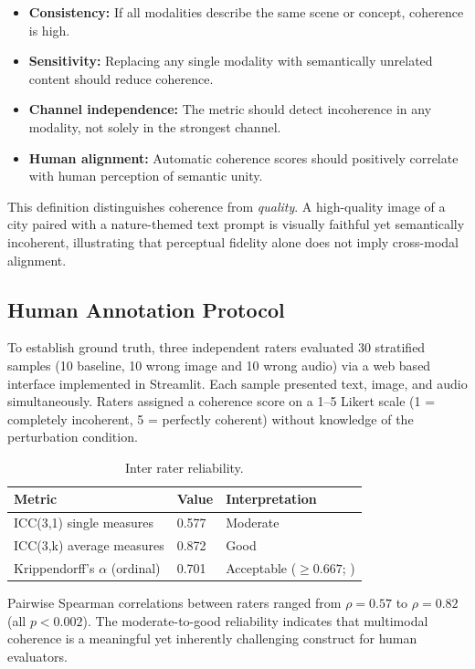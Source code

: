 \documentclass[a4paper,fleqn]{cas-sc}
\begin{document}
\begin{itemize}
    \item \textbf{Consistency:} If all modalities describe the same scene or concept, coherence is high.
    \item \textbf{Sensitivity:} Replacing any single modality with semantically unrelated content should reduce coherence.
    \item \textbf{Channel independence:} The metric should detect incoherence in any modality, not solely in the strongest channel.
    \item \textbf{Human alignment:} Automatic coherence scores should positively correlate with human perception of semantic unity.
\end{itemize}

This definition distinguishes coherence from \emph{quality}. A high-quality image of a city paired with a nature-themed text prompt is visually faithful yet semantically incoherent, illustrating that perceptual fidelity alone does not imply cross-modal alignment.

\subsection{Human Annotation Protocol}

To establish ground truth, three independent raters evaluated 30 stratified samples (10 baseline, 10 wrong image and 10 wrong audio) via a web based interface implemented in Streamlit. Each sample presented text, image, and audio simultaneously. Raters assigned a coherence score on a 1--5 Likert scale (1 = completely incoherent, 5 = perfectly coherent) without knowledge of the perturbation condition.

\begin{table}[!b]
\centering
\caption{Inter rater reliability.}
\label{tab:irr}
\begin{tabular}{lll}
\toprule
Metric & Value & Interpretation \\
\midrule
ICC(3,1) single measures & 0.577 & Moderate \citep{Koo2016} \\
ICC(3,k) average measures & 0.872 & Good \\
Krippendorff's $\alpha$ (ordinal) & 0.701 & Acceptable ($\geq 0.667$; \citealp{Krippendorff2011}) \\
\bottomrule
\end{tabular}
\end{table}

Pairwise Spearman correlations between raters ranged from $\rho = 0.57$ to $\rho = 0.82$ (all $p < 0.002$). The moderate-to-good reliability indicates that multimodal coherence is a meaningful yet inherently challenging construct for human evaluators.
\end{document}
